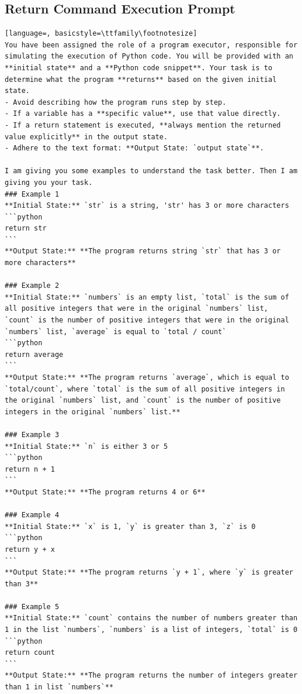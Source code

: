 \documentclass[sigconf]{acmart}
\begin{document}
\subsection{Return Command Execution Prompt}
\label{return_prompt}
\begin{tcolorbox}[ colback=gray!10, colframe=black, arc=5pt]
\begin{lstlisting}[language=, basicstyle=\ttfamily\footnotesize]
You have been assigned the role of a program executor, responsible for simulating the execution of Python code. You will be provided with an **initial state** and a **Python code snippet**. Your task is to determine what the program **returns** based on the given initial state.
- Avoid describing how the program runs step by step.
- If a variable has a **specific value**, use that value directly.
- If a return statement is executed, **always mention the returned value explicitly** in the output state.
- Adhere to the text format: **Output State: `output state`**.

I am giving you some examples to understand the task better. Then I am giving you your task.
### Example 1  
**Initial State:** `str` is a string, 'str' has 3 or more characters  
```python
return str
```
**Output State:** **The program returns string `str` that has 3 or more characters**

### Example 2  
**Initial State:** `numbers` is an empty list, `total` is the sum of all positive integers that were in the original `numbers` list, `count` is the number of positive integers that were in the original `numbers` list, `average` is equal to `total / count`  
```python
return average
```
**Output State:** **The program returns `average`, which is equal to `total/count`, where `total` is the sum of all positive integers in the original `numbers` list, and `count` is the number of positive integers in the original `numbers` list.**

### Example 3  
**Initial State:** `n` is either 3 or 5  
```python
return n + 1
```
**Output State:** **The program returns 4 or 6**

### Example 4  
**Initial State:** `x` is 1, `y` is greater than 3, `z` is 0  
```python
return y + x
```
**Output State:** **The program returns `y + 1`, where `y` is greater than 3**

### Example 5  
**Initial State:** `count` contains the number of numbers greater than 1 in the list `numbers`, `numbers` is a list of integers, `total` is 0  
```python
return count
```
**Output State:** **The program returns the number of integers greater than 1 in list `numbers`**


\end{lstlisting}
\end{tcolorbox}
\end{document}
